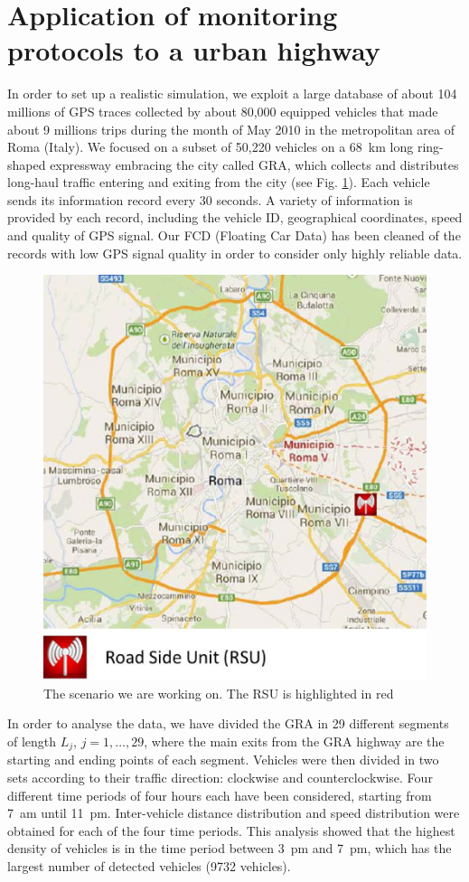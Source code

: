 \documentclass[conference]{IEEEtran}
\begin{document}
\section{Application of monitoring protocols to a urban highway}
\label{sec:realcase}
In order to set up a realistic simulation, we exploit a large database of about 104 millions of GPS traces collected by about 80,000 equipped vehicles that made about 9 millions trips during the month of May 2010 in the metropolitan area of Roma (Italy). We focused on a subset of 50,220 vehicles on a 68~km long ring-shaped expressway embracing the city called GRA, which collects and distributes long-haul traffic entering and exiting from the city (see Fig. \ref{fig:scenario}). Each vehicle sends its information record every 30 seconds. A variety of information is provided by each record, including the vehicle ID, geographical coordinates, speed and quality of GPS signal. Our FCD (Floating Car Data) has been cleaned of the records with low GPS signal quality in order to consider only highly reliable data.

\begin{figure}[tb]
\begin{center}
\includegraphics[width=.8\columnwidth]{fig/Scenario.eps}
\caption{The scenario we are working on. The RSU is highlighted in red}
\label{fig:scenario}
\end{center}
\end{figure}

In order to analyse the data, we have divided the GRA in 29 different segments of length $L_j$, $j=1,\dots, 29$, where the main exits from the GRA highway are the starting and ending points of each segment. Vehicles were then divided in two sets according to their traffic direction: clockwise and counterclockwise. Four different time periods of four hours each have been considered, starting from 7~am until 11~pm. Inter-vehicle distance distribution and speed distribution were obtained  for each of the four time periods. This analysis showed that the highest density of vehicles is in the time period between 3~pm and 7~pm, which has the largest number of detected vehicles (9732 vehicles).
\end{document}
